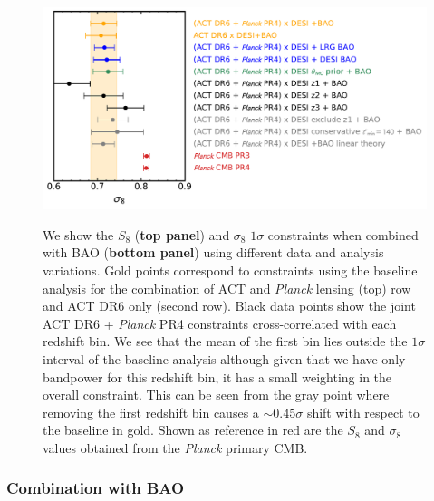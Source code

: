 \documentclass[twocolumn]{aastex631}
\begin{document}
{\begin{figure}
    \includegraphics[width=\linewidth]{figures/sigma8_robustness.pdf} \\ %
    \vspace{-8pt} %
    
    \caption{We show the $S_8$ (\textbf{top panel}) and $\sigma_8$ $1\sigma$ constraints when combined with BAO  (\textbf{bottom panel}) using different data and analysis variations. Gold points correspond to constraints using the baseline analysis for the combination of ACT and \textit{Planck} lensing (top) row and ACT DR6 only (second row). Black data points show the joint ACT DR6 + \textit{Planck} PR4 constraints cross-correlated with each redshift bin. We see that the mean of the first bin lies outside the $1\sigma$ interval of the baseline analysis although given that we have only bandpower for this redshift bin, it has a small weighting in the overall constraint. This can be seen from the gray point where removing the first redshift bin causes a $\sim0.45\sigma$ shift with respect to the baseline in gold. Shown as reference in red are the $S_8$ and $\sigma_8$ values obtained from the \textit{Planck} primary CMB.
}
    \label{bao_robustness}
\end{figure}




\subsubsection{Combination with BAO}

}
\end{document}
